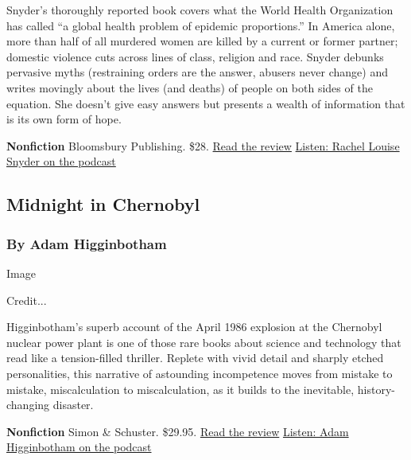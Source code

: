 Snyder's thoroughly reported book covers what the World Health
Organization has called ``a global health problem of epidemic
proportions.'' In America alone, more than half of all murdered women
are killed by a current or former partner; domestic violence cuts across
lines of class, religion and race. Snyder debunks pervasive myths
(restraining orders are the answer, abusers never change) and writes
movingly about the lives (and deaths) of people on both sides of the
equation. She doesn't give easy answers but presents a wealth of
information that is its own form of hope.

\textbf{Nonfiction} \textbar{} Bloomsbury Publishing. \$28. \textbar{}
\href{https://www.nytimes3xbfgragh.onion/2019/06/07/books/review/rachel-louise-snyder-no-visible-bruises.html}{Read
the review} \textbar{}
\href{https://www.nytimes3xbfgragh.onion/2019/06/07/books/review/podcast-no-visible-bruises-rachel-louise-snyder-queen-josh-levin.html}{Listen:
Rachel Louise Snyder on the podcast}

\hypertarget{midnight-in-chernobyl}{%
\subsection{Midnight in Chernobyl}\label{midnight-in-chernobyl}}

\hypertarget{by-adam-higginbotham}{%
\subsubsection{By Adam Higginbotham}\label{by-adam-higginbotham}}

Image

Credit...

Higginbotham's superb account of the April 1986 explosion at the
Chernobyl nuclear power plant is one of those rare books about science
and technology that read like a tension-filled thriller. Replete with
vivid detail and sharply etched personalities, this narrative of
astounding incompetence moves from mistake to mistake, miscalculation to
miscalculation, as it builds to the inevitable, history-changing
disaster.

\textbf{Nonfiction} \textbar{} Simon \& Schuster. \$29.95. \textbar{}
\href{https://www.nytimes3xbfgragh.onion/2019/02/06/books/review-midnight-chernobyl-adam-higginbotham.html}{Read
the review} \textbar{}
\href{https://www.nytimes3xbfgragh.onion/2019/04/05/books/review/podcast-midnight-in-chernobyl-nuclear-accident-adam-higginbotham.html}{Listen:
Adam Higginbotham on the podcast}

